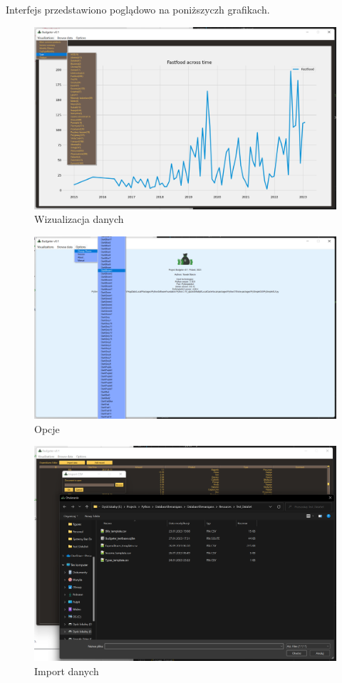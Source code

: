 \documentclass[a4paper,10pt, twoside]{report}
\begin{document}
{Interfejs przedstawiono poglądowo na poniższyczh grafikach.}
\begin{figure}[H]           %
    \caption{Wizualizacja danych}
    \label{fig:Wizualizacja_danych}    %
    \centering  
    \includegraphics[width=12cm]{figures/Interface_Visualizations_v0.3.png}
\end{figure}

\begin{figure}[H]           %
    \caption{Opcje}
    \label{fig:Opcje}
    \centering  
    \includegraphics[width=12cm]{figures/Interface_Options_v0.3.png}
\end{figure}

\begin{figure}[H]           %
    \caption{Import danych}
    \label{fig:Import danych}
    \centering  
    \includegraphics[width=12cm]{figures/Interface_Browse_Import_v0.3.png}
\end{figure}
\end{document}
